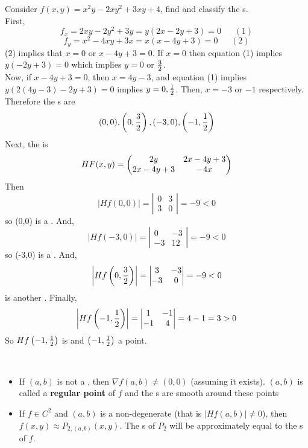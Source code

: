 \documentclass[english, 11pt]{article}
\begin{document}
\begin{exmp}
  Consider $f(x,y) = x^2y - 2xy^2 + 3xy + 4$, find and classify the s. \\

  First,
  \[ f_x = 2xy - 2y^2 + 3y = y(2x - 2y + 3) = 0 \ \ \ \ \ \ \ (1) \]
  \[ f_y = x^2 - 4xy + 3x = x(x - 4y + 3) = 0 \ \ \ \ \ \ \ (2) \]
  (2) implies that $x = 0$ or $x - 4y + 3 = 0$. If $x = 0$ then equation (1) implies $y(-2y + 3) = 0$ which implies $y = 0$ or $\frac{3}{2}$. \\

  Now, if $x - 4y + 3 = 0$, then $x = 4y - 3$, and equation (1) implies $y(2(4y-3) - 2y + 3) = 0$ implies $y = 0, \frac{1}{2}$. Then, $x = -3$ or $-1$ respectively. Therefore the s are
  \[ (0,0),\left( 0,\frac{3}{2} \right), (-3,0), \left( -1, \frac{1}{2} \right) \]
  Next, the  is
  \[ HF(x,y) = \left( \begin{matrix} 2y & 2x - 4y + 3 \\ 2x-4y+3 & -4x \end{matrix} \right) \]
  Then
  \[ |Hf(0,0)| = \left| \begin{matrix}
    0 & 3 \\ 3 & 0
  \end{matrix}\right| = -9 < 0\]
  so (0,0) is a . And,
   \[ |Hf(-3,0)| = \left| \begin{matrix}
    0 & -3 \\ -3 & 12
  \end{matrix}\right| = -9 < 0\]
  so (-3,0) is a . And,
  \[ \left| Hf \left( 0,\frac{3}{2} \right) \right| = \left| \begin{matrix}
    3 & -3 \\ -3 & 0
  \end{matrix}\right| = -9 < 0\]
  is another . Finally,
  \[ \left| Hf \left( -1,\frac{1}{2} \right)\right| =  \left| \begin{matrix}
    1 & -1 \\ -1 & 4
  \end{matrix}\right| = 4 - 1 = 3 > 0\]
  So $Hf \left( -1, \frac{1}{2} \right)$ is  and $\left( -1, \frac{1}{2} \right)$ a  point.
\end{exmp}

\begin{rem} \
  \begin{itemize}
    \item If $(a,b)$ is not a , then $\nabla f(a,b) \not = (0,0)$ (assuming it exists). $(a,b)$ is called a \textbf{regular point} of $f$ and the s are smooth around these points
    \item If $f \in C^2$ and $(a,b)$ is a non-degenerate (that is $|Hf(a,b)| \not = 0$), then $f(x,y) \approx P_{2,(a,b)}(x,y)$. The \nameref{level curve}s of $P_2$ will be approximately equal to the \nameref{level curve}s of $f$.  \end{itemize}
\end{rem}
\end{document}
